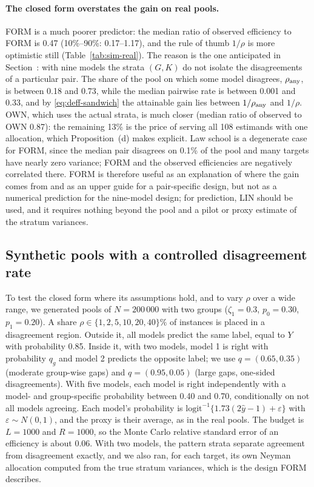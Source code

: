 \paragraph{The closed form overstates the gain on real pools.} FORM is a much poorer predictor: the
median ratio of observed efficiency to FORM is 0.47 (10\%--90\%: 0.17--1.17), and the rule of thumb
$1/\rho$ is more optimistic still (Table~\ref{tab:sim-real}). The reason is the one anticipated in
Section~: with nine models the strata $(G,K)$ do not isolate the disagreements of
a particular pair. The share of the pool on which some model disagrees, $\rho_{\rm any}$, is between
0.18 and 0.73, while the median pairwise rate is between 0.001 and 0.33, and by
\eqref{eq:deff-sandwich} the attainable gain lies between $1/\rho_{\rm any}$ and $1/\rho$. OWN, which
uses the actual strata, is much closer (median ratio of observed to OWN 0.87): the remaining 13\% is
the price of serving all 108 estimands with one allocation, which Proposition~(d)
makes explicit. Law school is a degenerate case for FORM, since the median pair disagrees on 0.1\% of
the pool and many targets have nearly zero variance; FORM and the observed efficiencies are
negatively correlated there. FORM is therefore useful as an explanation of where the gain comes from
and as an upper guide for a pair-specific design, but not as a numerical prediction for the
nine-model design; for prediction, LIN should be used, and it requires nothing beyond the pool and a
pilot or proxy estimate of the stratum variances.

\subsection{Synthetic pools with a controlled disagreement rate}\label{sec:sim-synth}

To test the closed form where its assumptions hold, and to vary $\rho$ over a wide range, we
generated pools of $N=200\,000$ with two groups ($\zeta_1=0.3$, $p_0=0.30$, $p_1=0.20$). A share
$\rho\in\{1,2,5,10,20,40\}\%$ of instances is placed in a disagreement region. Outside it, all models
predict the same label, equal to $Y$ with probability 0.85. Inside it, with two models, model 1 is
right with probability $q_g$ and model 2 predicts the opposite label; we use $q=(0.65,0.35)$
(moderate group-wise gaps) and $q=(0.95,0.05)$ (large gaps, one-sided disagreements). With five
models, each model is right independently with a model- and group-specific probability between 0.40
and 0.70, conditionally on not all models agreeing. Each model's probability is
$\mathrm{logit}^{-1}\{1.73(2\hat y-1)+\varepsilon\}$ with $\varepsilon\sim N(0,1)$, and the proxy is their
average, as in the real pools. The budget is $L=1000$ and $R=1000$, so the Monte Carlo relative
standard error of an efficiency is about 0.06. With two models, the pattern strata separate agreement
from disagreement exactly, and we also ran, for each target, its own Neyman allocation computed from
the true stratum variances, which is the design FORM describes.

